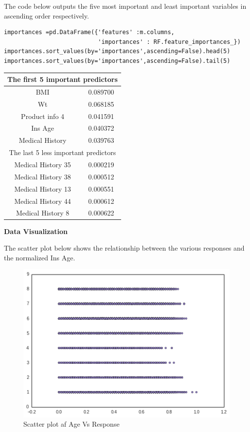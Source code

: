 The code below outputs the five most important and least important variables in ascending order respectively.

\begin{verbatim}
importances =pd.DataFrame({'features' :m.columns,
                           'importances' : RF.feature_importances_})
importances.sort_values(by='importances',ascending=False).head(5)
importances.sort_values(by='importances',ascending=False).tail(5)
\end{verbatim}

\begin{tabular}{|c|c|}
\hline 
\multicolumn{2}{|c|}{The first 5 important predictors} \\ 
\hline 
BMI & 0.089700 \\ 
\hline 
Wt & 0.068185 \\ 
\hline 
Product info 4 & 0.041591 \\ 
\hline 
Ins Age & 0.040372 \\ 
\hline 
Medical History & 0.039763 \\ 
\hline 
\multicolumn{2}{|c|}{The last 5 less important predictors} \\ 
\hline 
Medical History 35 & 0.000219\\
\hline 
Medical History 38 & 0.000512 \\ 
\hline 
Medical History 13 & 0.000551 \\ 
\hline 
Medical History 44 & 0.000612 \\ 
\hline 
Medical History 8 & 0.000622 \\ 
\hline 
\end{tabular} 

\begin{center}
\textbf{Data Visualization}
\end{center}

The scatter plot below shows the relationship between the various responses and the normalized Ins Age.

\begin{figure}[hbtp]
\caption{Scatter plot af Age Vs Response}
\centering
\includegraphics[scale=0.5]{Scatterplot.png}
\end{figure}

